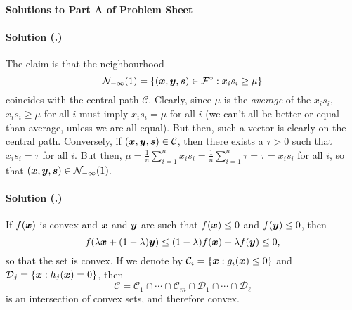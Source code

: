 \documentclass{article}
\newcounter{problemSheetNumber}
\newcounter{problems}
\renewcommand{\solution}[1]{\paragraph{Solution (\theproblemSheetNumber.\theproblems)}\addtocounter{problems}{1}\label{#1}}
\begin{document}
 
\begin{center}
{\Large {\bf Solutions to Part A of Problem Sheet \theproblemSheetNumber}}
\end{center}

\solution{pr:1} The claim is that the neighbourhood
\begin{equation*}
 \mathcal{N}_{-\infty}(1) = \{(\bm{x},\bm{y},\bm{s})\in \mathcal{F}^{\circ} \mathrel{\mathop{:}} x_is_i\geq \mu\}
\end{equation*}
coincides with the central path $\mathcal{C}$. Clearly, since $\mu$ is the {\em average} of the $x_is_i$,
$x_is_i\geq \mu$ for all $i$ must imply $x_is_i=\mu$ for all $i$ (we can't all be better or equal than average, unless we are all equal). But then, such a vector is clearly on the central path. Conversely, if $(\bm{x},\bm{y},\bm{s})\in \mathcal{C}$, then there exists a $\tau>0$ such that $x_is_i=\tau$ for all $i$. But then, $\mu = \frac{1}{n}\sum_{i=1}^n x_is_i = \frac{1}{n}\sum_{i=1}^n \tau = \tau = x_is_i$ for all $i$, so that $(\bm{x},\bm{y},\bm{s})\in \mathcal{N}_{-\infty}(1)$. 

\solution{pr:2} If $f(\bm{x})$ is convex and $\bm{x}$ and $\bm{y}$ are such that $f(\bm{x})\leq 0$ and $f(\bm{y})\leq 0$, then
\begin{equation*}
 f(\lambda \bm{x}+(1-\lambda)\bm{y})\leq (1-\lambda)f(\bm{x})+\lambda f(\bm{y}) \leq 0,
\end{equation*}
so that the set is convex. If we denote by $\mathcal{C}_i=\{\bm{x}\mathrel{\mathop{:}} g_i(\bm{x})\leq 0\}$ and $\mathcal{D}_j=\{\bm{x}\mathrel{\mathop{:}} h_j(\bm{x})=0\}$, then 
\begin{equation*}
 \mathcal{C}=\mathcal{C}_1\cap\cdots \cap \mathcal{C}_m\cap \mathcal{D}_1\cap\cdots \cap \mathcal{D}_\ell
\end{equation*}
is an intersection of convex sets, and therefore convex.
\end{document}

